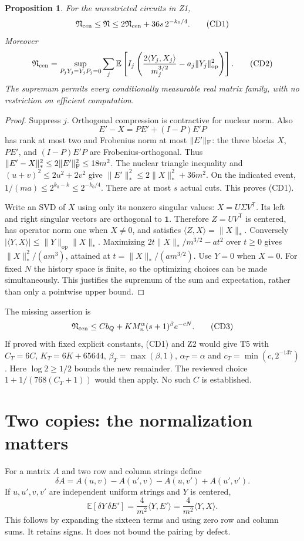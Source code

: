 \documentclass[11pt]{article}
\newtheorem{proposition}{Proposition}
\newcommand{\E}{\mathbb E}
\newcommand{\op}{\mathrm{op}}
\begin{document}
\begin{proposition}
For the unrestricted circuits in Z1,
\[
 \mathfrak N_{\rm cen}\le\mathfrak N
 \le2\mathfrak N_{\rm cen}+36s\,2^{-k_0/4}.             \tag{CD1}
\]
Moreover
\[
 \mathfrak N_{\rm cen}
 =\sup_{P_jY_j=Y_jP_j=0}
 \sum_j\E\left[I_j\left(
 \frac{2\langle Y_j,X_j\rangle}{m_j^{3/2}}
                     -a_j\|Y_j\|_{\op}^2\right)\right]. \tag{CD2}
\]
The supremum permits every conditionally measurable real matrix
family, with no restriction on efficient computation.
\end{proposition}
\begin{proof}
Suppress $j$. Orthogonal compression is contractive for nuclear norm.
Also
\[
 E'-X=PE'+(I-P)E'P
\]
has rank at most two and Frobenius norm at most $\|E'\|_{\rm F}$:
the three blocks $X$, $PE'$, and $(I-P)E'P$ are Frobenius-orthogonal.
Thus $\|E'-X\|_*^2\le2\|E'\|_{\rm F}^2\le18m^2$.
The nuclear triangle inequality and $(u+v)^2\le2u^2+2v^2$
give
$\|E'\|_*^2\le2\|X\|_*^2+36m^2$.
On the indicated event, $1/(ma)\le2^{k_0-k}\le2^{-k_0/4}$.
There are at most $s$ actual cuts. This proves (CD1).

Write an SVD of $X$ using only its nonzero singular values:
$X=U\Sigma V^{\mathsf T}$. Its left and right singular vectors
are orthogonal to $\boldsymbol1$. Therefore $Z=UV^{\mathsf T}$
is centered, has operator norm one when $X\ne0$, and satisfies
$\langle Z,X\rangle=\|X\|_*$.
Conversely $|\langle Y,X\rangle|\le\|Y\|_{\op}\|X\|_*$.
Maximizing
$2t\|X\|_*/m^{3/2}-at^2$ over $t\ge0$ gives
$\|X\|_*^2/(am^3)$, attained at
$t=\|X\|_*/(am^{3/2})$. Use $Y=0$ when $X=0$.
For fixed $N$ the history space is finite, so the optimizing choices
can be made simultaneously. This justifies the supremum of the sum
and expectation, rather than only a pointwise upper bound.
\end{proof}

The missing assertion is
\[
 \mathfrak N_{\rm cen}\le Cb_Q+
                K M_n^\alpha(s+1)^\beta e^{-cN}.        \tag{CD3}
\]
If proved with fixed explicit constants, (CD1) and Z2 would give
T5 with $C_T=6C$, $K_T=6K+65644$,
$\beta_T=\max(\beta,1)$, $\alpha_T=\alpha$ and
$c_T=\min(c,2^{-137})$. Here $\log2\ge1/2$ bounds the new
remainder. The reviewed choice
$1+1/(768(C_T+1))$ would then apply. No such $C$ is established.

\section{Two copies: the normalization matters}
For a matrix $A$ and two row and column strings define
\[
 \delta A=A(u,v)-A(u',v)-A(u,v')+A(u',v').
\]
If $u,u',v,v'$ are independent uniform strings and $Y$ is centered,
\[
 \E[\delta Y\,\delta E']
           =\frac4{m^2}\langle Y,E'\rangle
           =\frac4{m^2}\langle Y,X\rangle.              \tag{CD4}
\]
This follows by expanding the sixteen terms and using zero row and
column sums. It retains signs. It does not bound the pairing by defect.
\end{document}
